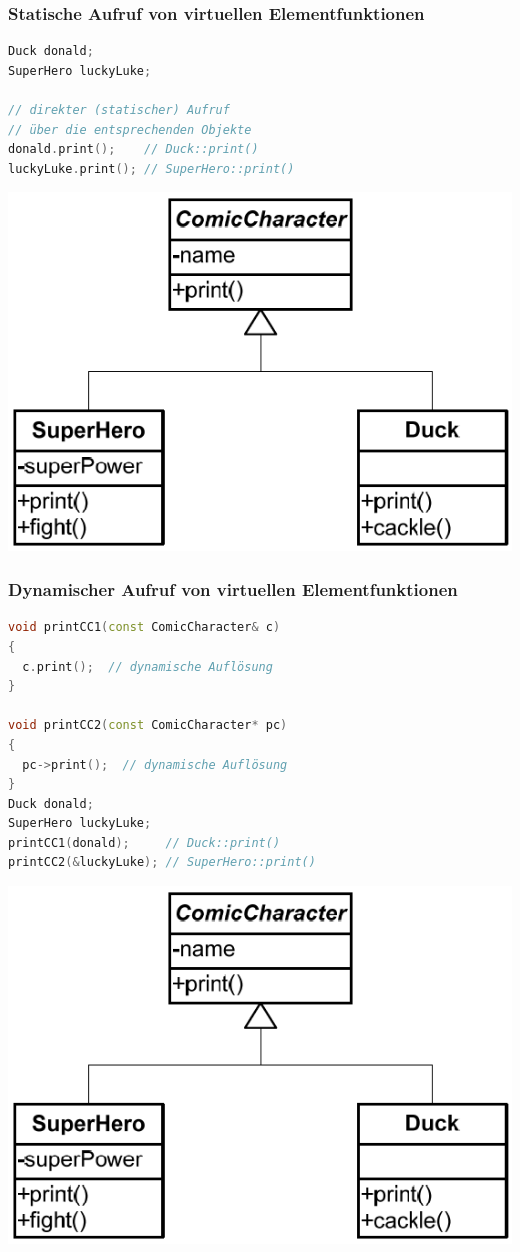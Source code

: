 \subsubsection{Statische Aufruf von virtuellen Elementfunktionen}
\begin{multicols}{2}
\begin{lstlisting}[language=C++]
Duck donald;
SuperHero luckyLuke;

// direkter (statischer) Aufruf
// über die entsprechenden Objekte
donald.print();    // Duck::print()
luckyLuke.print(); // SuperHero::print()
\end{lstlisting}
\vfill\null
\columnbreak
\includegraphics[width=0.5\linewidth]{images/AdvancedCPP/classDiagram}
\end{multicols}

\subsubsection{Dynamischer Aufruf von virtuellen Elementfunktionen}
\begin{multicols}{2}
\begin{lstlisting}[language=C++]
void printCC1(const ComicCharacter& c)
{
  c.print();  // dynamische Auflösung
}

void printCC2(const ComicCharacter* pc)
{
  pc->print();  // dynamische Auflösung
}
Duck donald;
SuperHero luckyLuke;
printCC1(donald);     // Duck::print()
printCC2(&luckyLuke); // SuperHero::print()
\end{lstlisting}
\columnbreak
\includegraphics[width=0.5\linewidth]{images/AdvancedCPP/classDiagram}
\end{multicols}

